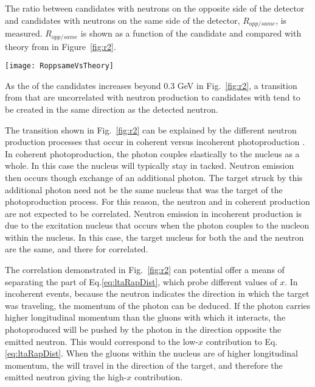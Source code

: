     The ratio between candidates with neutrons on the opposite side of the 
      detector and candidates with neutrons on the same side of the detector,
      $R_{opp/same}$, is measured.
    $R_{opp/same}$ is shown as a function of the candidate \pt{} and compared
      with theory from \cite{Guzey:2013jaa} in Figure~\ref{fig:r2}.
    \begin{figure*}[!Hhtb]
      \begin{center}
        \texttt{[image: RoppsameVsTheory]}
        \caption{\label{fig:r2}Ratio between the transverse momentum 
          distribution of the $J/\psi$ when  $J/\psi$ and neutron have 
          the opposite direction and the transverse momentum distribution 
          of the $J/\psi$ when  $J/\psi$ and neutron have the same direction.}
      \end{center}
    \end{figure*}
    As the \pt{} of the candidates increases beyond 0.3 GeV in Fig.~\ref{fig:r2},
      a transition from \JPsi{} that are uncorrelated with neutron production 
      to \JPsi{} candidates with tend to be created in the same direction as
      the detected neutron. 

    The transition shown in Fig.~\ref{fig:r2} can be explained by the different
      neutron production processes that occur in coherent versus incoherent 
      photoproduction \cite{Strikman:2005ze}.
    In coherent photoproduction, the photon couples elastically to the nucleus 
      as a whole.
    In this case the nucleus will typically stay in tacked.
    Neutron emission then occurs though exchange of an additional photon. 
    The target struck by this additional photon need not be the same nucleus
      that was the target of the photoproduction process. 
    For this reason, the neutron and \JPsi{} in coherent production are not 
      expected to be correlated.
    Neutron emission in incoherent production is due to the excitation nucleus 
      that occurs when the photon couples to the nucleon within the nucleus. 
    In this case, the target nucleus for both the \JPsi{} and the neutron 
       are the same, and there for correlated. 

    The correlation demonstrated in Fig.~\ref{fig:r2} can potential offer a 
      means of separating the part of Eq.\ref{eq:ltaRapDist}, which probe 
      different values of $x$. 
    In incoherent events, because the neutron indicates the direction in which
      the target was traveling, the momentum of the photon can be deduced. 
    If the photon carries higher longitudinal momentum than the gluons with 
      which it interacts, the photoproduced \JPsi{} will be pushed by the 
      photon in the direction opposite the emitted neutron. 
    This would correspond to the low-$x$ contribution to Eq.\ref{eq:ltaRapDist}.
    When the gluons within the nucleus are of higher longitudinal momentum, 
      the \JPsi{} will travel in the direction of the target, and therefore
      the emitted neutron giving the high-$x$ contribution. 
    
